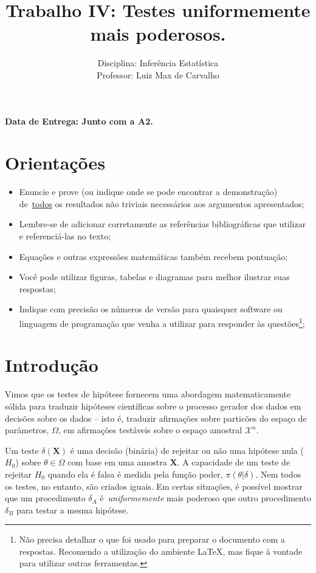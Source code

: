 \documentclass[a4paper,10pt, notitlepage]{report}
\title{Trabalho IV: Testes uniformemente mais poderosos.}
\author{Disciplina: Inferência Estatística \\ Professor: Luiz Max de Carvalho}
\newcommand{\bX}{\boldsymbol{X}} %
\begin{document}
\maketitle

\textbf{Data de Entrega: Junto com a A2.}

\section*{Orientações}
\begin{itemize}
 \item Enuncie e prove (ou indique onde se pode encontrar a demonstração) de~\underline{todos} os resultados não triviais necessários aos argumentos apresentados;
 \item Lembre-se de adicionar corretamente as referências bibliográficas que utilizar e referenciá-las no texto;
 \item Equações e outras expressões matemáticas também recebem pontuação;
 \item Você pode utilizar figuras, tabelas e diagramas para melhor ilustrar suas respostas;
 \item Indique com precisão os números de versão para quaisquer software ou linguagem de programação que venha a utilizar para responder às questões\footnote{Não precisa detalhar o que foi usado para preparar o documento com a respostas. Recomendo a utilização do ambiente LaTeX, mas fique à vontade para utilizar outras ferramentas.};
 \end{itemize}


\section*{Introdução}

Vimos que os testes de hipótese fornecem uma abordagem matematicamente sólida para traduzir hipóteses científicas sobre o processo gerador dos dados em decisões sobre os dados -- isto é, traduzir afirmações sobre particões do espaço de parâmetros, $\Omega$, em afirmações testáveis sobre o espaço amostral $\mathcal{X}^n$.

Um teste $\delta(\bX)$ é uma decisão (binária) de rejeitar ou não uma hipótese nula ($H_0$) sobre $\theta \in \Omega$ com base em uma amostra $\bX$.
A capacidade de um teste de rejeitar $H_0$ quando ela é falsa é medida pela função poder, $\pi(\theta |\delta)$.
Nem todos os testes, no entanto, são criados iguais.
Em certas situações, é possível mostrar que um procedimento $\delta_A$ é~\textit{uniformemente} mais poderoso que outro procedimento $\delta_B$ para testar a mesma hipótese.
\end{document}
